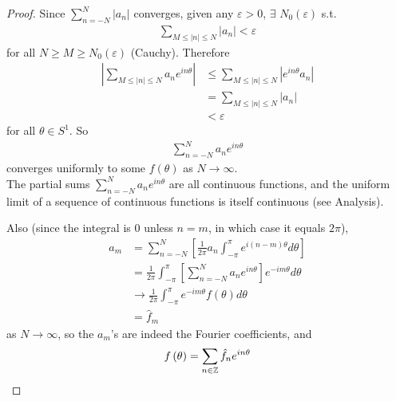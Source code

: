 \documentclass[a4paper]{article}
\begin{document}
\begin{proof}
Since $\sum_{n=-N}^N |a_n|$ converges, given any $\varepsilon > 0$, $\exists$ $N_0\left(\varepsilon\right)$ s.t.
\begin{equation*}
\begin{aligned}
\sum_{M \leq |n| \leq N} |a_n| < \varepsilon
\end{aligned}
\end{equation*}
for all $N \geq M \geq N_0\left(\varepsilon\right)$ (Cauchy). Therefore
\begin{equation*}
\begin{aligned}
\left|\sum_{M \leq |n| \leq N} a_n e^{in\theta} \right| & \leq \sum_{M \leq |n| \leq N} |e^{in\theta} a_n|\\
& = \sum_{M \leq |n| \leq N} |a_n| \\
&< \varepsilon
\end{aligned}
\end{equation*}
for all $\theta \in S^1$. So
\begin{equation*}
\begin{aligned}
\sum_{n=-N}^N a_n e^{in\theta}
\end{aligned}
\end{equation*}
converges uniformly to some $f\left(\theta\right)$ as $N \to \infty$.\\
The partial sums $\sum_{n=-N}^N a_n e^{in\theta}$ are all continuous functions, and the uniform limit of a sequence of continuous functions is itself continuous (see Analysis).

Also (since the integral is $0$ unless $n=m$, in which case it equals $2\pi$),
\begin{equation*}
\begin{aligned}
a_m &= \sum_{n=-N}^N \left[\frac{1}{2\pi} a_n \int_{-\pi}^\pi e^{i\left(n-m\right)\theta} d\theta\right]\\
&= \frac{1}{2\pi} \int_{-\pi}^\pi \left[\sum_{n=-N}^Na_n e^{in\theta} \right] e^{-im\theta} d\theta\\
&\to \frac{1}{2\pi} \int_{-\pi}^\pi e^{-im\theta} f\left(\theta\right) d\theta \\
&= \hat{f}_m
\end{aligned}
\end{equation*}
as $N \to \infty$, so the $a_m$'s are indeed the Fourier coefficients, and
\begin{equation*}
\begin{aligned}
f\left(\theta\right) = \sum_{n \in \mathbb{Z}} \hat{f}_n e^{in\theta}
\end{aligned}
\end{equation*}
\end{proof}
\end{document}
